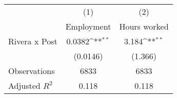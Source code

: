 {
\def\sym#1{\ifmmode^{#1}\else\(^{#1}\)\fi}
\begin{tabular}{l*{2}{c}}
\hline\hline
                &\multicolumn{1}{c}{(1)}&\multicolumn{1}{c}{(2)}\\
                &\multicolumn{1}{c}{Employment}&\multicolumn{1}{c}{Hours worked}\\
\hline
Rivera x Post   &   0.0382\sym{**} &    3.184\sym{**} \\
                & (0.0146)         &  (1.366)         \\
\hline
Observations    &     6833         &     6833         \\
Adjusted \(R^{2}\)&    0.118         &    0.118         \\
\hline\hline
\end{tabular}
}
